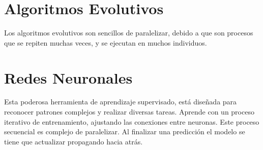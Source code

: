 	
	\newpage %
	\section{Algoritmos Evolutivos}
		Los algoritmos evolutivos son sencillos de paralelizar, debido a que son procesos que se repiten muchas veces, y se ejecutan en muchos individuos.
	
	\newpage %
	\section{Redes Neuronales}
		Esta poderosa herramienta de aprendizaje supervisado, está diseñada para reconocer patrones complejos y realizar diversas tareas. Aprende con un proceso iterativo de entrenamiento, ajustando las conexiones entre neuronas. Este proceso secuencial es complejo de paralelizar. Al finalizar una predicción el modelo se tiene que actualizar propagando hacia atrás.
	
